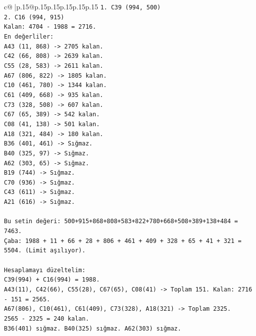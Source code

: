 \documentclass{article}
\begin{document}
{\begin{supertabular}{c@{$\;$}|p{.15\linewidth}@{}p{.15\linewidth}p{.15\linewidth}p{.15\linewidth}p{.15\linewidth}p{.15\linewidth}}
{{{\texttt{1. C39 (994, 500)} \\
\texttt{2. C16 (994, 915)} \\
\texttt{Kalan: 4704 {-} 1988 = 2716.} \\
\texttt{En değerliler:} \\
\texttt{A43 (11, 868) {-}> 2705 kalan.} \\
\texttt{C42 (66, 808) {-}> 2639 kalan.} \\
\texttt{C55 (28, 583) {-}> 2611 kalan.} \\
\texttt{A67 (806, 822) {-}> 1805 kalan.} \\
\texttt{C10 (461, 780) {-}> 1344 kalan.} \\
\texttt{C61 (409, 668) {-}> 935 kalan.} \\
\texttt{C73 (328, 508) {-}> 607 kalan.} \\
\texttt{C67 (65, 389) {-}> 542 kalan.} \\
\texttt{C08 (41, 138) {-}> 501 kalan.} \\
\texttt{A18 (321, 484) {-}> 180 kalan.} \\
\texttt{B36 (401, 461) {-}> Sığmaz.} \\
\texttt{B40 (325, 97) {-}> Sığmaz.} \\
\texttt{A62 (303, 65) {-}> Sığmaz.} \\
\texttt{B19 (744) {-}> Sığmaz.} \\
\texttt{C70 (936) {-}> Sığmaz.} \\
\texttt{C43 (611) {-}> Sığmaz.} \\
\texttt{A21 (616) {-}> Sığmaz.} \\
\\ 
\texttt{Bu setin değeri: 500+915+868+808+583+822+780+668+508+389+138+484 = 7463.} \\
\texttt{Çaba: 1988 + 11 + 66 + 28 + 806 + 461 + 409 + 328 + 65 + 41 + 321 = 5504. (Limit aşılıyor).} \\
\\ 
\texttt{Hesaplamayı düzeltelim:} \\
\texttt{C39(994) + C16(994) = 1988.} \\
\texttt{A43(11), C42(66), C55(28), C67(65), C08(41) {-}> Toplam 151. Kalan: 2716 {-} 151 = 2565.} \\
\texttt{A67(806), C10(461), C61(409), C73(328), A18(321) {-}> Toplam 2325.} \\
\texttt{2565 {-} 2325 = 240 kalan.} \\
\texttt{B36(401) sığmaz. B40(325) sığmaz. A62(303) sığmaz.} \\
}}}
\end{supertabular}}
\end{document}
